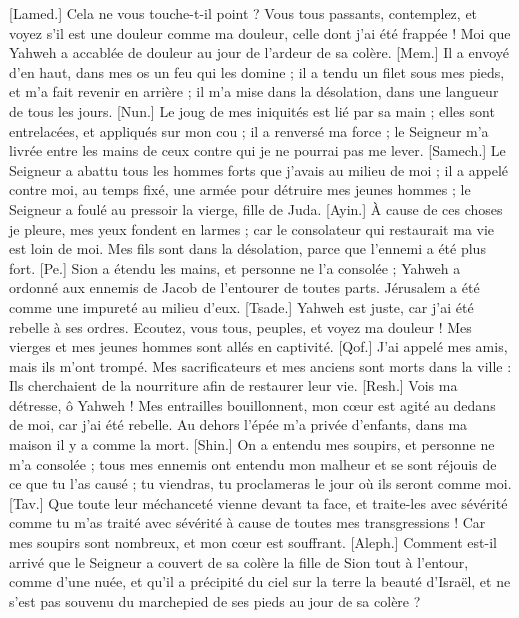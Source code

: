 \begin{multicols}{2}
[Lamed.] Cela ne vous touche-t-il point ? Vous tous passants, contemplez, et voyez s'il est une douleur comme ma douleur, celle dont j'ai été frappée ! Moi que Yahweh a accablée de douleur au jour de l'ardeur de sa colère.
[Mem.] Il a envoyé d'en haut, dans mes os un feu qui les domine ; il a tendu un filet sous mes pieds, et m'a fait revenir en arrière ; il m'a mise dans la désolation, dans une langueur de tous les jours.
[Nun.] Le joug de mes iniquités est lié par sa main ; elles sont entrelacées, et appliqués sur mon cou ; il a renversé ma force ; le Seigneur m’a livrée entre les mains de ceux contre qui je ne pourrai pas me lever.
[Samech.] Le Seigneur a abattu tous les hommes forts que j'avais au milieu de moi ; il a appelé contre moi, au temps fixé, une armée pour détruire mes jeunes hommes ; le Seigneur a foulé au pressoir la vierge, fille de Juda.
[Ayin.] À cause de ces choses je pleure, mes yeux fondent en larmes ; car le consolateur qui restaurait ma vie est loin de moi. Mes fils sont dans la désolation, parce que l'ennemi a été plus fort.
[Pe.] Sion a étendu les mains, et personne ne l'a consolée ; Yahweh a ordonné aux ennemis de Jacob de l’entourer de toutes parts. Jérusalem a été comme une impureté au milieu d'eux.
[Tsade.] Yahweh est juste, car j'ai été rebelle à ses ordres. Ecoutez, vous tous, peuples, et voyez ma douleur ! Mes vierges et mes jeunes hommes sont allés en captivité.
[Qof.] J'ai appelé mes amis, mais ils m'ont trompé. Mes sacrificateurs et mes anciens sont morts dans la ville : Ils cherchaient de la nourriture afin de restaurer leur vie.
[Resh.] Vois ma détresse, ô Yahweh ! Mes entrailles bouillonnent, mon cœur est agité au dedans de moi, car j'ai été rebelle. Au dehors l’épée m’a privée d’enfants, dans ma maison il y a comme la mort.
[Shin.] On a entendu mes soupirs, et personne ne m'a consolée ; tous mes ennemis ont entendu mon malheur et se sont réjouis de ce que tu l’as causé ; tu viendras, tu proclameras le jour où ils seront comme moi.
[Tav.] Que toute leur méchanceté vienne devant ta face, et traite-les avec sévérité comme tu m'as traité avec sévérité à cause de toutes mes transgressions ! Car mes soupirs sont nombreux, et mon cœur est souffrant.
\VerseOne{}[Aleph.] Comment est-il arrivé que le Seigneur a couvert  de sa colère la fille de Sion tout à l’entour, comme d’une nuée, et qu’il a précipité du ciel sur la terre la beauté d’Israël, et ne s’est pas souvenu du marchepied de ses pieds au jour de sa colère ?

\end{multicols}
